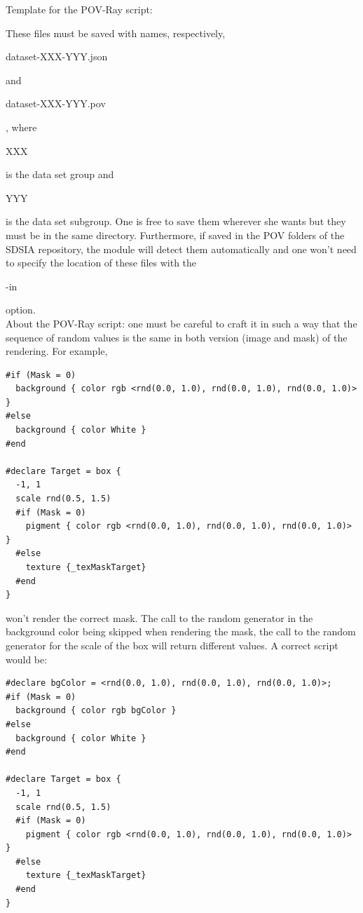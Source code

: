 Template for the POV-Ray script:\\
\begin{scriptsize}
\begin{ttfamily}

\end{ttfamily}
\end{scriptsize}

These files must be saved with names, respectively, \begin{ttfamily}dataset-XXX-YYY.json\end{ttfamily} and \begin{ttfamily}dataset-XXX-YYY.pov\end{ttfamily}, where \begin{ttfamily}XXX\end{ttfamily} is the data set group and \begin{ttfamily}YYY\end{ttfamily} is the data set subgroup. One is free to save them wherever she wants but they must be in the same directory. Furthermore, if saved in the POV folders of the SDSIA repository, the module will detect them automatically and one won't need to specify the location of these files with the \begin{ttfamily}-in\end{ttfamily} option.\\

About the POV-Ray script: one must be careful to craft it in such a way that the sequence of random values is the same in both version (image and mask) of the rendering. For example,
\begin{scriptsize}
\begin{ttfamily}
\begin{verbatim}
#if (Mask = 0)
  background { color rgb <rnd(0.0, 1.0), rnd(0.0, 1.0), rnd(0.0, 1.0)> }
#else
  background { color White }
#end

#declare Target = box {
  -1, 1
  scale rnd(0.5, 1.5)
  #if (Mask = 0)
    pigment { color rgb <rnd(0.0, 1.0), rnd(0.0, 1.0), rnd(0.0, 1.0)> }
  #else
    texture {_texMaskTarget}
  #end
}
\end{verbatim}
\end{ttfamily}
\end{scriptsize}
won't render the correct mask. The call to the random generator in the background color being skipped when rendering the mask, the call to the random generator for the scale of the box will return different values. A correct script would be:
\begin{scriptsize}
\begin{ttfamily}
\begin{verbatim}
#declare bgColor = <rnd(0.0, 1.0), rnd(0.0, 1.0), rnd(0.0, 1.0)>;
#if (Mask = 0)
  background { color rgb bgColor }
#else
  background { color White }
#end

#declare Target = box {
  -1, 1
  scale rnd(0.5, 1.5)
  #if (Mask = 0)
    pigment { color rgb <rnd(0.0, 1.0), rnd(0.0, 1.0), rnd(0.0, 1.0)> }
  #else
    texture {_texMaskTarget}
  #end
}
\end{verbatim}
\end{ttfamily}
\end{scriptsize}

